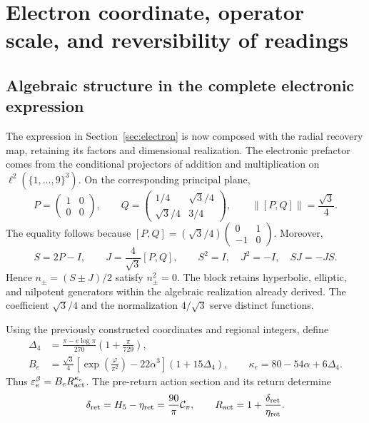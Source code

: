 \section{Electron coordinate, operator scale, and reversibility of readings}
\label{rec:recuperacion}

\subsection{Algebraic structure in the complete electronic expression}

The expression in Section~\ref{sec:electron} is now composed with the radial recovery map, retaining its factors and dimensional realization. The electronic prefactor comes from the conditional projectors of addition and multiplication on \(\ell^2(\{1,\ldots,9\}^3)\). On the corresponding principal plane,
\[
 P=\begin{pmatrix}1&0\\0&0\end{pmatrix},\qquad
 Q=\begin{pmatrix}1/4&\sqrt3/4\\\sqrt3/4&3/4\end{pmatrix},
 \qquad\|[P,Q]\|=\frac{\sqrt3}{4}.
\]
The equality follows because
\([P,Q]=(\sqrt3/4)\left(\begin{smallmatrix}0&1\\-1&0\end{smallmatrix}\right)\).
Moreover,
\[
 S=2P-I,\qquad J=\frac4{\sqrt3}[P,Q],\qquad
 S^2=I,\quad J^2=-I,\quad SJ=-JS.
\]
Hence \(n_\pm=(S\pm J)/2\) satisfy \(n_\pm^2=0\). The block retains hyperbolic, elliptic, and nilpotent generators within the algebraic realization already derived. The coefficient \(\sqrt3/4\) and the normalization \(4/\sqrt3\) serve distinct functions.

Using the previously constructed coordinates and regional integers, define
\begin{align}
 \Delta_4&=\frac{\pi-e\log\pi}{270}\left(1+\frac\pi{729}\right),\nonumber\\
 B_e&=\frac{\sqrt3}{4}
       \left[\exp\!\left(\frac\varphi{\pi^2}\right)-22\alpha^3\right]
       (1+15\Delta_4),\qquad
 \kappa_e=80-54\alpha+6\Delta_4.
 \label{rec:eq:electron-basal}
\end{align}
Thus \(\varepsilon_e^{\beta}=B_eR_{\rm act}^{\kappa_e}\). The pre-return action section and its return determine
\[
 \delta_{\rm ret}=H_5-\eta_{\rm ret}=\frac{90}{\pi}\mathcal C_\pi,
 \qquad R_{\rm act}=1+\frac{\delta_{\rm ret}}{\eta_{\rm ret}}.
\]

